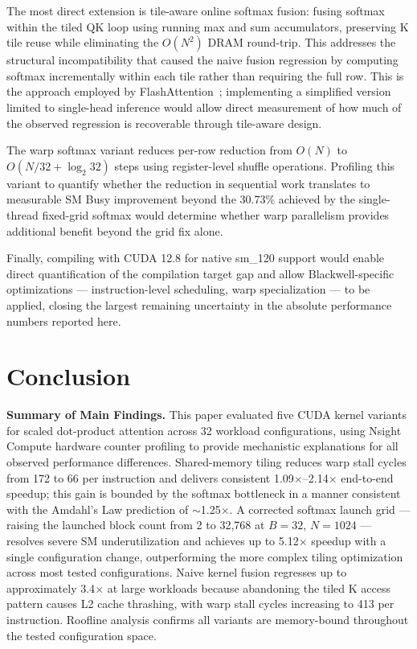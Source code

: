 \documentclass{article}
\begin{document}
The most direct extension is tile-aware online softmax fusion: fusing softmax
within the tiled QK loop using running max and sum accumulators, preserving
K tile reuse while eliminating the $O(N^2)$ DRAM round-trip. This addresses
the structural incompatibility that caused the naive fusion regression by
computing softmax incrementally within each tile rather than requiring the
full row. This is the approach employed by FlashAttention~\cite{dao2022flashattention};
implementing a simplified version limited to single-head inference would
allow direct measurement of how much of the observed regression is
recoverable through tile-aware design.

The warp softmax variant reduces per-row reduction from $O(N)$ to
$O(N/32+\log_2 32)$ steps using register-level shuffle operations. Profiling
this variant to quantify whether the reduction in sequential work translates
to measurable SM Busy improvement beyond the 30.73\% achieved by the
single-thread fixed-grid softmax would determine whether warp parallelism
provides additional benefit beyond the grid fix alone.

Finally, compiling with CUDA 12.8 for native sm\_120 support would enable
direct quantification of the compilation target gap and allow Blackwell-specific
optimizations — instruction-level scheduling, warp specialization — to be
applied, closing the largest remaining uncertainty in the absolute performance
numbers reported here.

\section{Conclusion}
\label{sec:conclusion}

\textbf{Summary of Main Findings.}
This paper evaluated five CUDA kernel variants for scaled dot-product
attention across 32 workload configurations, using Nsight Compute hardware
counter profiling to provide mechanistic explanations for all observed
performance differences. Shared-memory tiling reduces warp stall cycles
from 172 to 66 per instruction and delivers consistent
1.09$\times$--2.14$\times$ end-to-end speedup; this gain is bounded by the
softmax bottleneck in a manner consistent with the Amdahl's Law prediction
of $\sim$1.25$\times$. A corrected softmax launch grid — raising the launched
block count from 2 to 32,768 at $B{=}32$, $N{=}1024$ — resolves severe SM
underutilization and achieves up to 5.12$\times$ speedup with a single
configuration change, outperforming the more complex tiling optimization
across most tested configurations. Naive kernel fusion regresses up to
approximately 3.4$\times$ at large workloads because abandoning the tiled
K access pattern causes L2 cache thrashing, with warp stall cycles
increasing to 413 per instruction. Roofline analysis confirms all variants
are memory-bound throughout the tested configuration space.
\end{document}
